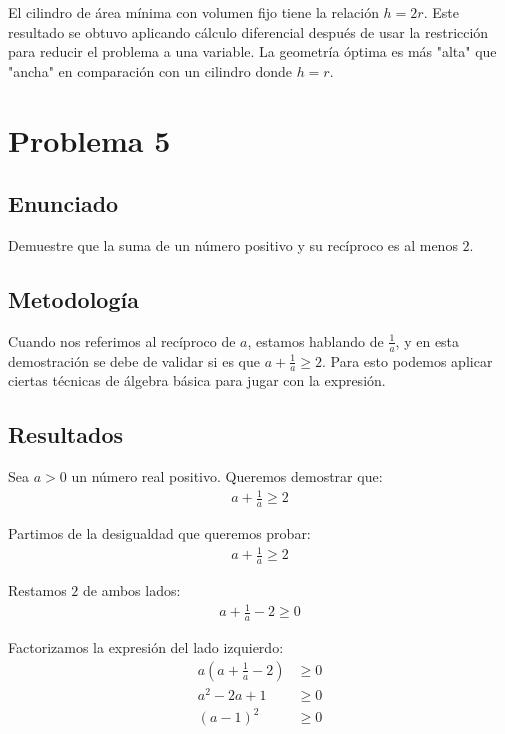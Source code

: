 \documentclass{article}
\begin{document}
El cilindro de área mínima con volumen fijo tiene la relación $h = 2r$. Este resultado se obtuvo aplicando cálculo diferencial después de usar la restricción para reducir el problema a una variable. La geometría óptima es más "alta" que "ancha" en comparación con un cilindro donde $h = r$.

\section{Problema 5}

\subsection{Enunciado}
Demuestre que la suma de un número positivo y su recíproco es al menos $2$.

\subsection{Metodología}

Cuando nos referimos al recíproco de $a$, estamos hablando de $\frac{1}{a}$, y en esta demostración se debe de validar si es que $a + \frac{1}{a} \geq 2$. Para esto podemos aplicar ciertas técnicas de álgebra básica para jugar con la expresión.

\subsection{Resultados}
\setcounter{equation}{0}

Sea $a > 0$ un número real positivo. Queremos demostrar que:
\begin{align}
a + \frac{1}{a} \geq 2
\end{align}

Partimos de la desigualdad que queremos probar:
\begin{align}
a + \frac{1}{a} \geq 2
\end{align}

Restamos $2$ de ambos lados:
\begin{align}
a + \frac{1}{a} - 2 \geq 0
\end{align}

Factorizamos la expresión del lado izquierdo:
\begin{align}
a\left(a + \frac{1}{a} - 2\right) &\geq 0 \\
a^2 - 2a + 1 &\geq 0 \\
(a - 1)^2 &\geq 0
\end{align}
\end{document}
